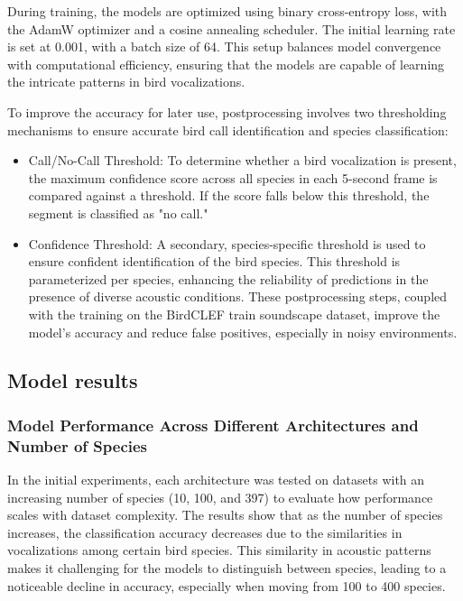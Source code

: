 During training, the models are optimized using binary cross-entropy loss, with the AdamW optimizer and a cosine annealing scheduler. The initial learning rate is set at 0.001, with a batch size of 64. This setup balances model convergence with computational efficiency, ensuring that the models are capable of learning the intricate patterns in bird vocalizations.

To improve the accuracy for later use, postprocessing involves two thresholding mechanisms to ensure accurate bird call identification and species classification:

\begin{itemize}
\item Call/No-Call Threshold: To determine whether a bird vocalization is present, the maximum confidence score across all species in each 5-second frame is compared against a threshold. If the score falls below this threshold, the segment is classified as "no call."
\item Confidence Threshold: A secondary, species-specific threshold is used to ensure confident identification of the bird species. This threshold is parameterized per species, enhancing the reliability of predictions in the presence of diverse acoustic conditions.
These postprocessing steps, coupled with the training on the BirdCLEF train soundscape dataset, improve the model's accuracy and reduce false positives, especially in noisy environments.
\end{itemize}

\subsection{Model results}

\subsubsection{Model Performance Across Different Architectures and Number of Species}

In the initial experiments, each architecture was tested on datasets with an increasing number of species (10, 100, and 397) to evaluate how performance scales with dataset complexity. The results show that as the number of species increases, the classification accuracy decreases due to the similarities in vocalizations among certain bird species. This similarity in acoustic patterns makes it challenging for the models to distinguish between species, leading to a noticeable decline in accuracy, especially when moving from 100 to 400 species.

